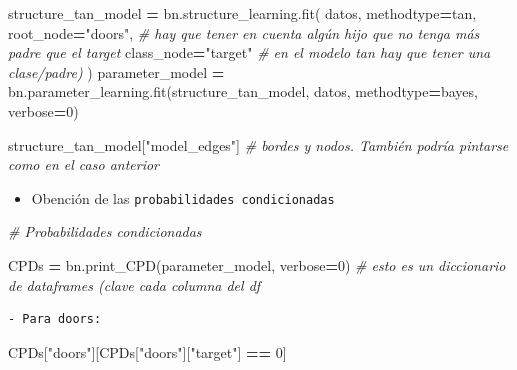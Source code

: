 \documentclass[
  a4paper,
  DIV=11,
  numbers=noendperiod]{scrreprt}
\newenvironment{Shaded}{\begin{snugshade}}{\end{snugshade}}
\newcommand{\CommentTok}[1]{\textcolor[rgb]{0.56,0.35,0.01}{\textit{#1}}}
\newcommand{\DecValTok}[1]{\textcolor[rgb]{0.00,0.00,0.81}{#1}}
\newcommand{\NormalTok}[1]{#1}
\newcommand{\OperatorTok}[1]{\textcolor[rgb]{0.81,0.36,0.00}{\textbf{#1}}}
\newcommand{\StringTok}[1]{\textcolor[rgb]{0.31,0.60,0.02}{#1}}
\providecommand{\tightlist}{%
  \setlength{\itemsep}{0pt}\setlength{\parskip}{0pt}}\usepackage{longtable,booktabs,array}
\begin{document}
\begin{Shaded}
\begin{Highlighting}[numbers=left,,]
\NormalTok{structure\_tan\_model }\OperatorTok{=}\NormalTok{ bn.structure\_learning.fit(}
\NormalTok{    datos,}
\NormalTok{    methodtype}\OperatorTok{=}\StringTok{\textquotesingle{}tan\textquotesingle{}}\NormalTok{,}
\NormalTok{    root\_node}\OperatorTok{=}\StringTok{"doors"}\NormalTok{, }\CommentTok{\# hay que tener en cuenta algún hijo que no tenga más padre que el target}
\NormalTok{    class\_node}\OperatorTok{=}\StringTok{"target"}  \CommentTok{\# en el modelo tan hay que tener una clase/padre)}
\NormalTok{) }
\NormalTok{parameter\_model }\OperatorTok{=}\NormalTok{ bn.parameter\_learning.fit(structure\_tan\_model, datos, methodtype}\OperatorTok{=}\StringTok{\textquotesingle{}bayes\textquotesingle{}}\NormalTok{, verbose}\OperatorTok{=}\DecValTok{0}\NormalTok{) }
\end{Highlighting}
\end{Shaded}

\begin{Shaded}
\begin{Highlighting}[numbers=left,,]
\NormalTok{structure\_tan\_model[}\StringTok{"model\_edges"}\NormalTok{] }\CommentTok{\# bordes y nodos. También podría pintarse como en el caso anterior}
\end{Highlighting}
\end{Shaded}

\begin{itemize}
\tightlist
\item
  Obención de las \texttt{probabilidades\ condicionadas}
\end{itemize}

\begin{Shaded}
\begin{Highlighting}[numbers=left,,]
\CommentTok{\# Probabilidades condicionadas}

\NormalTok{CPDs }\OperatorTok{=}\NormalTok{ bn.print\_CPD(parameter\_model, verbose}\OperatorTok{=}\DecValTok{0}\NormalTok{)  }\CommentTok{\# esto es un diccionario de dataframes (clave cada columna del df}
\end{Highlighting}
\end{Shaded}

\begin{verbatim}
- Para doors:
\end{verbatim}

\begin{Shaded}
\begin{Highlighting}[numbers=left,,]
\NormalTok{CPDs[}\StringTok{"doors"}\NormalTok{][CPDs[}\StringTok{"doors"}\NormalTok{][}\StringTok{"target"}\NormalTok{] }\OperatorTok{==} \DecValTok{0}\NormalTok{]}
\end{Highlighting}
\end{Shaded}
\end{document}
